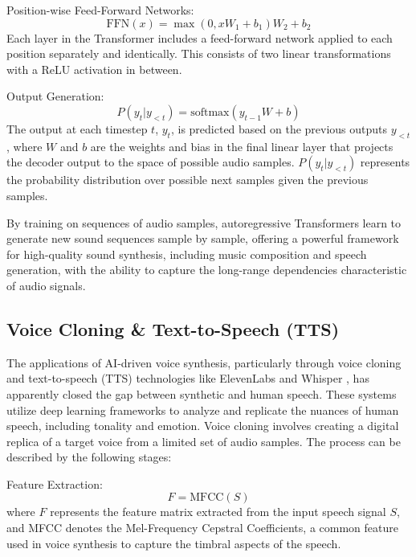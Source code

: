 \documentclass[11pt,a4paper,oneside]{report}
\begin{document}
Position-wise Feed-Forward Networks:
\begin{equation}
\text{FFN}(x) = \max(0, xW_1 + b_1)W_2 + b_2
\end{equation}
Each layer in the Transformer includes a feed-forward network applied to each position separately and identically. This consists of two linear transformations with a ReLU activation in between.

Output Generation:
\begin{equation}
P(y_t | y_{<t}) = \text{softmax}(y_{t-1}W + b)
\end{equation}
The output at each timestep $t$, $y_t$, is predicted based on the previous outputs $y_{<t}$, where $W$ and $b$ are the weights and bias in the final linear layer that projects the decoder output to the space of possible audio samples. $P(y_t | y_{<t})$ represents the probability distribution over possible next samples given the previous samples.

By training on sequences of audio samples, autoregressive Transformers learn to generate new sound sequences sample by sample, offering a powerful framework for high-quality sound synthesis, including music composition and speech generation, with the ability to capture the long-range dependencies characteristic of audio signals.

\subsection{Voice Cloning \& Text-to-Speech (TTS)}

The applications of AI-driven voice synthesis, particularly through voice cloning and text-to-speech (TTS) technologies like ElevenLabs \cite{elevenlabs} and Whisper \cite{OpenAIWhisper}, has apparently closed the gap between synthetic and human speech. 
These systems utilize deep learning frameworks to analyze and replicate the nuances of human speech, including tonality and emotion. 
Voice cloning involves creating a digital replica of a target voice from a limited set of audio samples. 
The process can be described by the following stages:

Feature Extraction:
\begin{equation}
F = \text{MFCC}(S)
\end{equation}
where $F$ represents the feature matrix extracted from the input speech signal $S$, and MFCC denotes the Mel-Frequency Cepstral Coefficients, a common feature used in voice synthesis to capture the timbral aspects of the speech.
\end{document}
